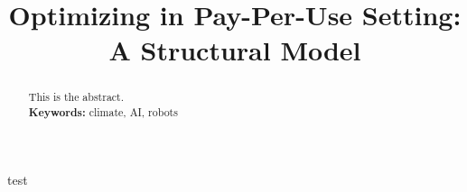 \documentclass{ssrn}
\title{Optimizing \LaTeXe in Pay-Per-Use Setting: A Structural Model}
\begin{document}
\maketitle
\begin{abstract}

    This is the abstract.
    \vspace{1em}\\
    \noindent\textbf{Keywords:} climate, AI, robots\\
    \bigskip
\end{abstract}
\newpage
test

\end{document}
